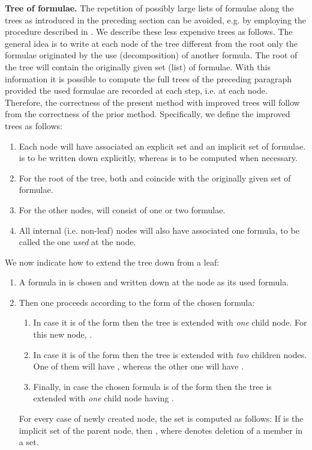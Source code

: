 \documentclass[a4paper,UKenglish]{lipics}
\newcounter{c}
\newcommand{\nentry}[1]{\noindent\textbf{#1}}
\begin{document}
\nentry{Tree of formulae.}
The repetition of possibly large lists of formulae along the trees as introduced in the preceding section can be avoided, e.g. by employing the procedure described in \cite{Smullyan}. We describe these less expensive trees as follows. 
The general idea is to write at each node of the tree different from the root only the formulae originated by the use (decomposition) of another formula. The root of the tree will contain the originally given set (list) of formulae. With this information it is possible to compute the full trees of the preceding paragraph provided the used formulae are recorded at each step, i.e. at each node. Therefore, the correctness of the present method with improved trees will follow from the correctness of the prior method. 
Specifically, we define the improved trees as follows:\begin{enumerate}
\item Each node will have associated an explicit set  
 and an implicit set  of formulae.  is to be written down explicitly, whereas  is to be computed when necessary.
\item For the root of the tree, both  and  coincide with the originally given set of formulae.
\item For the other nodes,  will consist of one or two formulae.
\item All internal (i.e. non-leaf) nodes will also have associated one formula, to be called the one \textit{used} at the node.
\end{enumerate}
We now indicate how to extend the tree down from a leaf:
\begin{enumerate}
\item A formula in  is chosen and written down at the node as its used formula.
\item Then one proceeds according to the form of the chosen formula:
\begin{enumerate}
\item In case it is of the form  then the tree is extended with \emph{one} child node. For this new node, . \item In case it is of the form  then the tree is extended with \emph{two} children nodes. One of them will have  , whereas the other one will have .
\item Finally, in case the chosen formula is of the form  then the tree is extended with \emph{one} child node having .
\end{enumerate}
For every case of newly created node, the set  is computed as follows: If   is the implicit set of the parent node, then , where  denotes deletion of a member in a set.
\end{enumerate}
\end{document}
